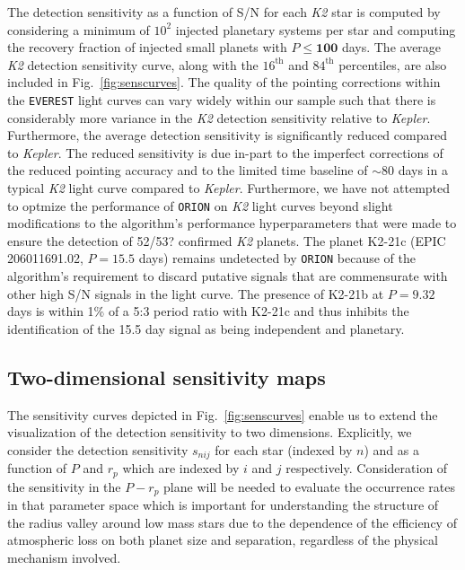 \documentclass[twocolumn]{emulateapj}
\newcommand{\kepler}[1]{\emph{Kepler}#1}
\newcommand{\ktwo}[1]{\emph{K2}#1}
\begin{document}
The detection sensitivity as a function of S/N for each \ktwo{} star is computed by considering a minimum of
$10^2$ injected planetary systems per star and computing the recovery fraction of injected small planets with
$P \leq \textbf{100}$ days. The average \ktwo{} detection sensitivity curve, along with the
$16^{\text{th}}$ and $84^{\text{th}}$ percentiles, are also included in Fig.~\ref{fig:senscurves}. The quality
of the pointing corrections within the \texttt{EVEREST} light curves can vary widely within our sample such
that there is considerably more variance in the \ktwo{} detection sensitivity relative to \kepler{.} Furthermore,
the average detection sensitivity is significantly reduced compared to \kepler{.} %
The reduced sensitivity is due in-part to the imperfect corrections of the reduced pointing accuracy and
to the limited time baseline of $\sim 80$ days in a typical \ktwo{} light curve compared to \kepler{.} 
Furthermore, we have not attempted to optmize the performance of \texttt{ORION} on \ktwo{} light curves 
beyond slight modifications to the algorithm's performance hyperparameters that were made to ensure the
detection of 52/53? confirmed \ktwo{} planets. The planet K2-21c (EPIC 206011691.02, $P=15.5$ days)
remains undetected by \texttt{ORION} because of the algorithm's requirement to discard putative signals
that are commensurate with other high S/N signals in the light curve. The presence of K2-21b at $P=9.32$ days
is within 1\% of a 5:3 period ratio with K2-21c and thus inhibits the identification of the 15.5 day signal
as being independent and planetary.


\subsection{Two-dimensional sensitivity maps}
The sensitivity curves depicted in Fig.~\ref{fig:senscurves} enable us to extend the visualization of the
detection sensitivity to two dimensions. Explicitly, we consider the detection sensitivity
$s_{nij}$ for each star (indexed by $n$) and as a function of $P$ and $r_p$ which are indexed by $i$ and
$j$ respectively. Consideration of the sensitivity in the $P-r_p$ plane will be needed to evaluate the
occurrence rates in that parameter space which is important for understanding the structure of
the radius valley around low mass stars due to the dependence of the efficiency of atmospheric loss on
both planet size and separation, regardless of the physical mechanism involved. 
\end{document}
